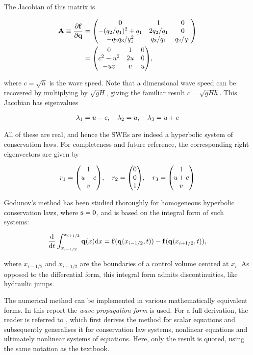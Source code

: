 The Jacobian of this matrix is

\begin{align}
  \vb A \equiv \pdv{\vb f}{\vb q} &= \mqty(
    0 & 1 & 0 \\
    - (q_2/q_1)^2 + q_1 & 2 q_2/q_1 & 0 \\
    - q_2q_3/q_1^2 & q_3/q_1 & q_2/q_1
  ) \\
  &= \mqty(
    0 & 1 & 0 \\
    c^2 - u^2 & 2u & 0 \\
    -uv & v & u
  ), \label{eq:swe_jacobian}
\end{align}

where $c = \sqrt{h}$ is the wave speed. Note that a dimensional wave speed can be recovered by multiplying by $\sqrt{gH}$, giving the familiar result $c = \sqrt{gHh}$. This Jacobian has eigenvalues

\begin{align}
  \lambda_1 = u - c \qc \lambda_2 = u \qc \lambda_3 = u + c
\end{align}

All of these are real, and hence the SWEs are indeed a hyperbolic system of conservation laws. For completeness and future reference, the corresponding right eigenvectors are given by

\begin{align}
  r_1 = \mqty(1 \\ u - c \\ v) \qc
  r_2 = \mqty(0 \\ 0 \\ 1) \qc
  r_3 = \mqty(1 \\ u + c \\ v)
\end{align}

Godunov's method has been studied thoroughly for homogeneous hyperbolic conservation laws, where $\vb s = 0$, and is based on the integral form of such systems:

\begin{align}
  \label{eq:claw_integral}
  \dv{t} \int_{x_{i-1/2}}^{x_{i+1/2}} \vb q(x) \dd x = \vb f(\vb q(x_{i-1/2},t)) - \vb f(\vb q(x_{i+1/2},t)),
\end{align}

where $x_{i-1/2}$ and $x_{i+1/2}$ are the boundaries of a control volume centred at $x_i$. As opposed to the differential form, this integral form admits discontinuities, like hydraulic jumps.

The numerical method can be implemented in various mathematically equivalent forms. In this report the \emph{wave propagation form} is used. For a full derivation, the reader is referred to \citet{leveque2002finite}, which first derives the method for scalar equations and subsequently generalises it for conservation law systems, nonlinear equations and ultimately nonlinear systems of equations. Here, only the result is quoted, using the same notation as the textbook.

